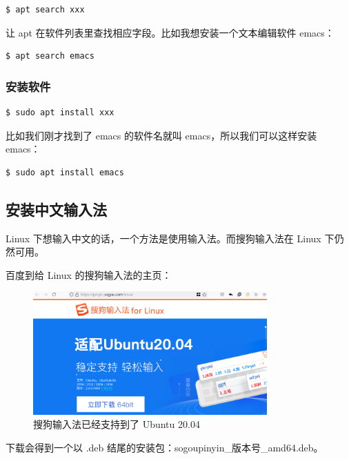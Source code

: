 \documentclass[UTF-8]{ctexart}
\begin{document}
				\begin{verbatim}
$ apt search xxx
				\end{verbatim}
			
				让 apt 在软件列表里查找相应字段。比如我想安装一个文本编辑软件 emacs：
				
				\begin{verbatim}
$ apt search emacs
				\end{verbatim}

			\subsubsection{安装软件}
		
				\begin{verbatim}
$ sudo apt install xxx
				\end{verbatim}
				
				比如我们刚才找到了 emacs 的软件名就叫 emacs，所以我们可以这样安装 emacs：
				
				\begin{verbatim}
$ sudo apt install emacs
				\end{verbatim}
			
		\subsection{安装中文输入法}
		
			Linux 下想输入中文的话，一个方法是使用输入法。而搜狗输入法在 Linux 下仍然可用。
			
			百度到给 Linux 的搜狗输入法的主页：
		
			\begin{figure}[H]
				\centering
				\includegraphics[width=0.8\textwidth]{fig/sogou.png}
				\caption*{搜狗输入法已经支持到了 Ubuntu 20.04}
			\end{figure}
	
			下载会得到一个以 .deb 结尾的安装包：sogoupinyin\_版本号\_amd64.deb。
			
\end{document}
